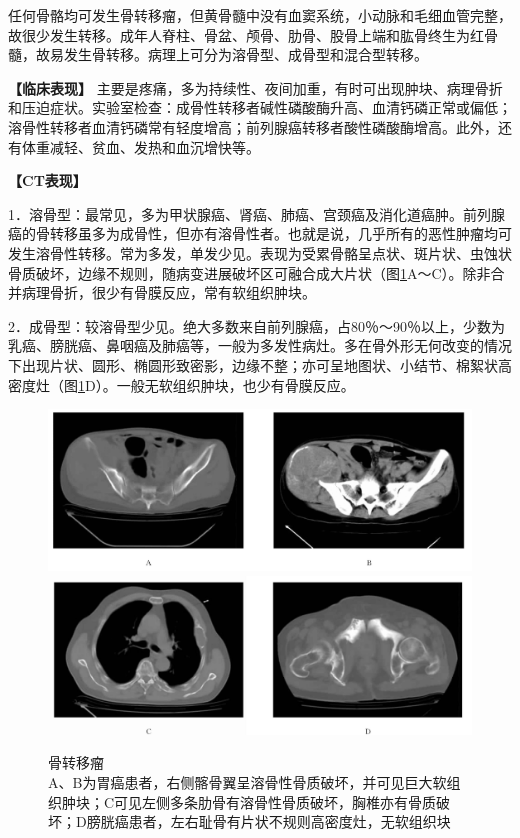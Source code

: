 任何骨骼均可发生骨转移瘤，但黄骨髓中没有血窦系统，小动脉和毛细血管完整，故很少发生转移。成年人脊柱、骨盆、颅骨、肋骨、股骨上端和肱骨终生为红骨髓，故易发生骨转移。病理上可分为溶骨型、成骨型和混合型转移。

\textbf{【临床表现】}
主要是疼痛，多为持续性、夜间加重，有时可出现肿块、病理骨折和压迫症状。实验室检查：成骨性转移者碱性磷酸酶升高、血清钙磷正常或偏低；溶骨性转移者血清钙磷常有轻度增高；前列腺癌转移者酸性磷酸酶增高。此外，还有体重减轻、贫血、发热和血沉增快等。

\textbf{【CT表现】}

1．溶骨型：最常见，多为甲状腺癌、肾癌、肺癌、宫颈癌及消化道癌肿。前列腺癌的骨转移虽多为成骨性，但亦有溶骨性者。也就是说，几乎所有的恶性肿瘤均可发生溶骨性转移。常为多发，单发少见。表现为受累骨骼呈点状、斑片状、虫蚀状骨质破坏，边缘不规则，随病变进展破坏区可融合成大片状（图\ref{fig22-22}A～C）。除非合并病理骨折，很少有骨膜反应，常有软组织肿块。

2．成骨型：较溶骨型少见。绝大多数来自前列腺癌，占80％～90％以上，少数为乳癌、膀胱癌、鼻咽癌及肺癌等，一般为多发性病灶。多在骨外形无何改变的情况下出现片状、圆形、椭圆形致密影，边缘不整；亦可呈地图状、小结节、棉絮状高密度灶（图\ref{fig22-22}D）。一般无软组织肿块，也少有骨膜反应。



\begin{figure}[!htbp]
 \centering
 \includegraphics[width=.7\textwidth,height=\textheight,keepaspectratio]{./images/Image00446.jpg}
 \includegraphics[width=.7\textwidth,height=\textheight,keepaspectratio]{./images/Image00447.jpg}
 \captionsetup{justification=centering}
 \caption{骨转移瘤\\{\small A、B为胃癌患者，右侧髂骨翼呈溶骨性骨质破坏，并可见巨大软组织肿块；C可见左侧多条肋骨有溶骨性骨质破坏，胸椎亦有骨质破坏；D膀胱癌患者，左右耻骨有片状不规则高密度灶，无软组织块}}
 \label{fig22-22}
  \end{figure} 

